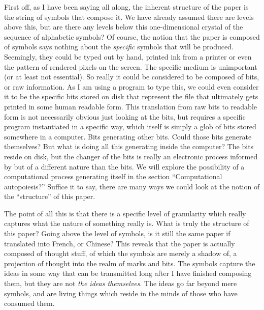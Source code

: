 \documentclass[12pt]{scrartcl}
\begin{document}
First off, as I have been saying all along, the inherent structure of the paper is the string of symbols that compose it.  We have already assumed there are levels above this, but are there any levels below this one-dimensional crystal of the sequence of alphabetic symbols?  Of course, the notion that the paper is composed of symbols says nothing about the \emph{specific} symbols that will be produced.  Seemingly, they could be typed out by hand, printed ink from a printer or even the pattern of rendered pixels on the screen.  The specific medium is unimportant (or at least not essential).  So really it could be considered to be composed of bits, or raw information.  As I am using a program to type this, we could even consider it to be the specific bits stored on disk that represent the file that ultimately gets printed in some human readable form.  This translation from raw bits to readable form is not necessarily obvious just looking at the bits, but requires a specific program instantiated in a specific way, which itself is simply a glob of bits stored somewhere in a computer.  Bits generating other bits.  Could those bits generate themselves?  But what is doing all this generating inside the computer?  The bits reside on disk, but the changer of the bits is really an electronic process informed by but of a different nature than the bits.  We will explore the possibility of a computational process generating itself in the section ``Computational autopoiesis?''  Suffice it to say, there are many ways we could look at the notion of the ``structure'' of this paper.

The point of all this is that there is a specific level of granularity which really captures what the nature of something really is.  What is truly the structure of this paper?  Going above the level of symbols, is it still the same paper if translated into French, or Chinese?  This reveals that the paper is actually composed of thought stuff, of which the symbols are merely a shadow of, a projection of thought into the realm of marks and bits.  The symbols capture the ideas in some way that can be transmitted long after I have finished composing them, but they are not \emph{the ideas themselves}.  The ideas go far beyond mere symbols, and are living things which reside in the minds of those who have consumed them.  
\end{document}
